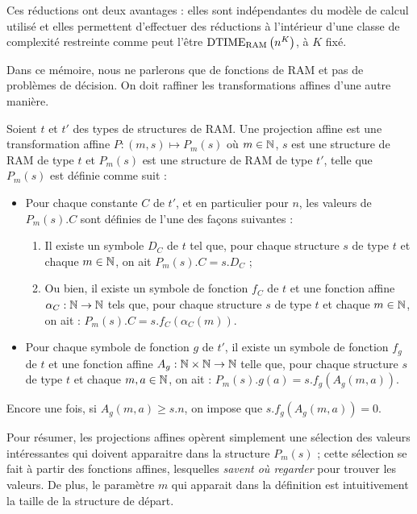 		Ces réductions ont deux avantages : elles sont indépendantes du modèle de calcul utilisé et elles permettent d'effectuer des réductions à l'intérieur d'une classe de complexité restreinte comme peut l'être $\text{DTIME}_{\text{RAM}}\left( n^K \right)$, à $K$ fixé.
		
		\espace
		
		Dans ce mémoire, nous ne parlerons que de fonctions de RAM et pas de problèmes de décision. On doit raffiner les transformations affines d'une autre manière.
		
		\begin{definition}
			\label{def:proj_affine}
			
			Soient $t$ et $t'$ des types de structures de RAM. Une projection affine est une transformation affine $P : (m,s) \mapsto P_m(s)$ où $m \in \mathbb{N}$, $s$ est une structure de RAM de type $t$ et $P_m(s)$ est une structure de RAM de type $t'$, telle que $P_m(s)$ est définie comme suit :
			
			\begin{itemize}
				\item	Pour chaque constante $C$ de $t'$, et en particulier pour $n$, les valeurs de $P_m(s).C$ sont définies de l'une des façons suivantes :
				\begin{enumerate}
					\item 	Il existe un symbole $D_C$ de $t$ tel que, pour chaque structure $s$ de type $t$ et chaque $m \in \mathbb{N}$, on ait $P_m(s).C = s.D_C$ ;
					\item 	Ou bien, il existe un symbole de fonction $f_C$ de $t$ et une fonction affine $\alpha_C : \mathbb{N} \to \mathbb{N}$ tels que, pour chaque structure $s$ de type $t$ et chaque $m \in \mathbb{N}$, on ait : $P_m(s).C = s.f_C\left( \alpha_C(m) \right)$.
				\end{enumerate}
				
				\item 	Pour chaque symbole de fonction $g$ de $t'$, il existe un symbole de fonction $f_g$ de $t$ et une fonction affine $A_g : \mathbb{N} \times \mathbb{N} \to \mathbb{N}$ telle que, pour chaque structure $s$ de type $t$ et chaque $m,a \in \mathbb{N}$, on ait : $P_m(s).g(a) = s.f_g\left( A_g(m,a) \right)$. 
			\end{itemize}
		\end{definition}
		
		Encore une fois, si $A_g(m,a) \geqslant s.n$, on impose que $s.f_g\left( A_g(m,a) \right) = 0$.
		
		Pour résumer, les projections affines opèrent simplement une sélection des valeurs intéressantes qui doivent apparaitre dans la structure $P_m(s)$ ; cette sélection se fait à partir des fonctions affines, lesquelles \emph{savent où regarder} pour trouver les valeurs. De plus, le paramètre $m$ qui apparait dans la définition est intuitivement la taille de la structure de départ.
		
